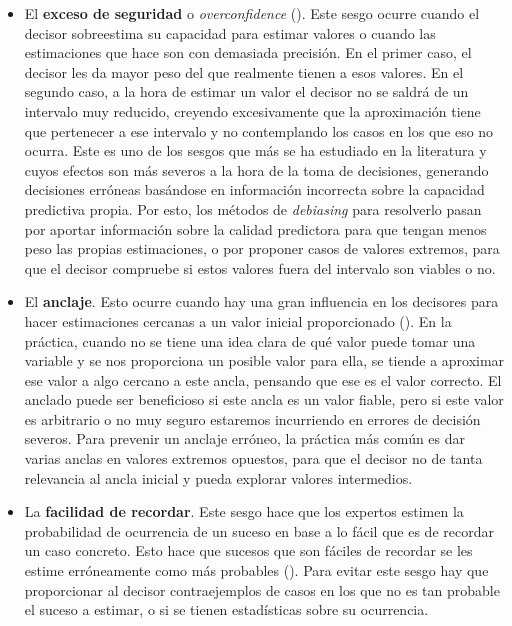 \documentclass[a4paper,11pt]{article}
\begin{document}
\begin{itemize}
\item El \textbf{exceso de seguridad} o \textit{overconfidence} (\cite{moore2008}). Este sesgo ocurre cuando el decisor sobreestima su capacidad para estimar valores o cuando las estimaciones que hace son con demasiada precisión. En el primer caso, el decisor les da mayor peso del que realmente tienen a esos valores. En el segundo caso, a la hora de estimar un valor el decisor no se saldrá de un intervalo muy reducido, creyendo excesivamente que la aproximación tiene que pertenecer a ese intervalo y no contemplando los casos en los que eso no ocurra. 
Este es uno de los sesgos que más se ha estudiado en la literatura y cuyos efectos son más severos a la hora de la toma de decisiones, generando decisiones erróneas basándose en información incorrecta sobre la capacidad predictiva propia. Por esto, los métodos de \textit{debiasing} para resolverlo pasan por aportar información sobre la calidad predictora para que tengan menos peso las propias estimaciones, o por proponer casos de valores extremos, para que el decisor compruebe si estos valores fuera del intervalo son viables o no.

\item El \textbf{anclaje}. Esto ocurre cuando hay una gran influencia en los decisores para hacer estimaciones cercanas a un valor inicial proporcionado (\cite{chapman2002}). En la práctica, cuando no se tiene una idea clara de qué valor puede tomar una variable y se nos proporciona un posible valor para ella, se tiende a aproximar ese valor a algo cercano a este ancla, pensando que ese es el valor correcto. El anclado puede ser beneficioso si este ancla es un valor fiable, pero si este valor es arbitrario o no muy seguro estaremos incurriendo en errores de decisión severos. Para prevenir un anclaje erróneo, la práctica más común es dar varias anclas en valores extremos opuestos, para que el decisor no de tanta relevancia al ancla inicial y pueda explorar valores intermedios.

\item La \textbf{facilidad de recordar}. Este sesgo hace que los expertos estimen la probabilidad de ocurrencia de un suceso en base a lo fácil que es de recordar un caso concreto. Esto hace que sucesos que son fáciles de recordar se les estime erróneamente como más probables (\cite{buon2008}). Para evitar este sesgo hay que proporcionar al decisor contraejemplos de casos en los que no es tan probable el suceso a estimar, o si se tienen estadísticas sobre su ocurrencia.

\end{itemize}
\end{document}
